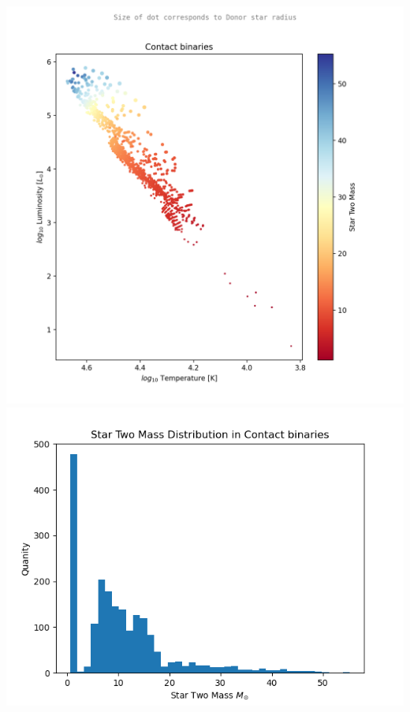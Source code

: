 \documentclass[12pt, letterpaper]{article}
\begin{document}
        \begin{center}
            \includegraphics[scale = .6 ]{Figs/contact binary HR diagram.png}
            \includegraphics[scale = .5 ]{Figs/Contact binaries Star Two Mass Distribution.png}
        \end{center}
 
\end{document}
